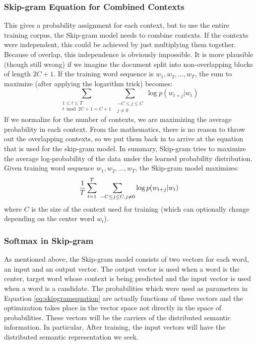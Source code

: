 \subsubsection{Skip-gram Equation for Combined Contexts}
This gives a probability assignment for each context, but to use the entire
training corpus, the Skip-gram model needs to combine contexts. If the contexts
were independent, this could be achieved by just multiplying them together.
Because of overlap, this independence is obviously impossible. It is more
plausible (though still wrong) if we imagine the document split into 
non-overlapping blocks of length $2C+1$. If 
the training word sequence is $w_1, w_2, \ldots, w_T$, the 
sum to maximize (after applying the logarithm trick) becomes:
%
\[\sum_{\substack{1 \le t \le T \\ t \bmod 2C+1 = C+1 }}\sum_{\substack{-C \le j \le C \\ j \ne 0 }} \log{p(w_{t+j}|w_t)}\]
%
If we normalize for the number of contexts, we are maximizing the average
probability in each context. From the mathematics, there is no reason to throw
out the overlapping contexts, so we put them back in to arrive at the equation
that is used for the skip-gram model. In summary, Skip-gram 
tries to maximize the average 
log-probability of the data under the learned probability distribution. Given
training word sequence $w_1, w_2, \ldots, w_T$, the Skip-gram model maximizes:
%
\begin{equation}
  \label{eq:skipgramequation}
  \frac{1}{T}\sum_{t=1}^T \; \sum_{-C \le j \le C, \\ j \ne 0 } \log p(w_{t+j}|w_t)
\end{equation}
%
where $C$ is the size of the context used for training (which can optionally 
change depending on the center word $w_t$). 

\subsubsection{Softmax in Skip-gram}

As mentioned above, the Skip-gram model consists of two vectors for each word, 
an input and an output vector. The output vector is used when a word is the 
center, target word whose context is being predicted and the input vector is 
used when a word is a candidate. The probabilities which were used as parameters
in Equation \ref{eq:skipgramequation} are actually functions of these vectors
and the optimization takes place in the vector space not directly in the space
of probabilities. These vectors will be the carriers of the distributed semantic
information. In particular, After training, the input vectors will have 
the distributed semantic representation we seek. 

